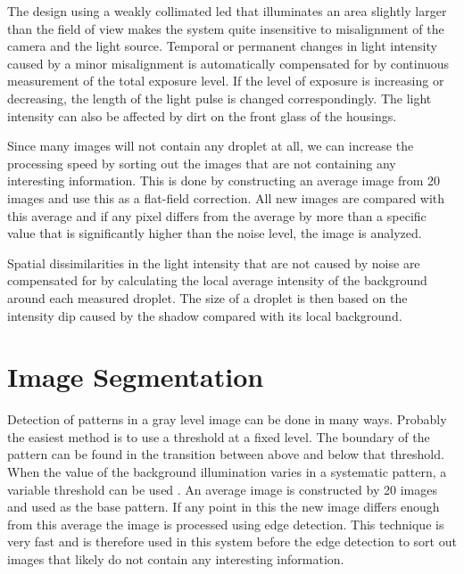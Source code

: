 The design using a weakly collimated \gls{led} that illuminates an area slightly larger than the field of view makes the system quite insensitive to misalignment of the camera and the light source. Temporal or permanent changes in light intensity caused by a minor misalignment is automatically compensated for by continuous measurement of the total exposure level. If the level of exposure is increasing or decreasing, the length of the light pulse is changed correspondingly. The light intensity can also be affected by dirt on the front glass of the housings. 

Since many images will not contain any droplet at all, we can increase the processing speed by sorting out the images that are not containing any interesting information. This is done by constructing an average image from 20 images and use this as a flat-field correction. All new images are compared with this average and if any pixel differs from the average by more than a specific value that is significantly higher than the noise level, the image is analyzed.

Spatial dissimilarities in the light intensity that are not caused by noise are compensated for by calculating the local average intensity of the background around each measured droplet. The size of a droplet is then based on the intensity dip caused by the shadow compared with its local background.


\section{Image Segmentation}
\label{imgsegment}

Detection of patterns in a gray level image can be done in many ways. Probably the easiest method is to use a threshold at a fixed level. The boundary of the pattern can be found in the transition between above and below that threshold. When the value of the background illumination varies in a systematic pattern, a variable threshold can be used \cite{gonz2002}. An average image is constructed by 20 images and used as the base pattern. If any point in this the new image differs enough from this average the image is processed using edge detection. This technique is very fast and is therefore used in this system before the edge detection to sort out images that likely do not contain any interesting information.

